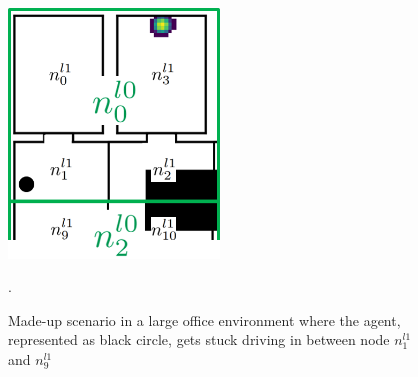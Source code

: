 \begin{figure}
    \centering
    \includegraphics[width=0.5\textwidth]{Report/images/stability.png}
    \caption{Made-up scenario in a large office environment where the agent, represented as black circle, gets stuck driving in between node $n_1^{l1}$ and $n_9^{l1}$}.
    \label{fig:stability}
\end{figure}

